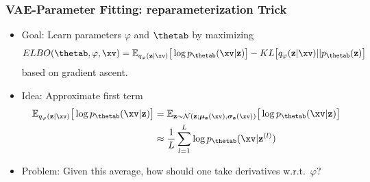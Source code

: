 \begin{frame}
\frametitle{VAE-Parameter Fitting: reparameterization Trick}
\begin{itemize}
\item Goal: Learn parameters $\varphi$ and $\thetab$ by maximizing %
\begin{equation*}
ELBO(\thetab, \varphi, \xv) = \mathbb{E}_{q_{\varphi}(\mathbf{z}|\xv)}\big[ \log p_{\thetab}(\xv|\mathbf{z}) \big] - KL\big[ q_{\varphi}(\mathbf{z}|\xv) ||  p_{\thetab}(\mathbf{z}) \big]
\end{equation*}
based on gradient ascent.
\item Idea: Approximate first term
\begin{align*}
\mathbb{E}_{q_{\varphi}(\mathbf{z}|\xv)}\big[ \log p_{\thetab}(\xv|\mathbf{z}) \big] &= \mathbb{E}_{\mathbf{z} \sim \mathcal{N}(\mathbf{z}; \bm{\mu}_{\mathbf{z}}(\xv), \bm{\sigma}_{\mathbf{z}}(\xv))}\big[ \log p_{\thetab}(\xv|\mathbf{z}) \big]\\
&\approx \frac{1}{L} \sum_{l=1}^{L} \log p_{\thetab}(\xv|\mathbf{z}^{(l)})
\end{align*}
\item  Problem:
Given this average,
how should one take derivatives
    w.r.t.~$\varphi$?
\end{itemize}

\end{frame}


